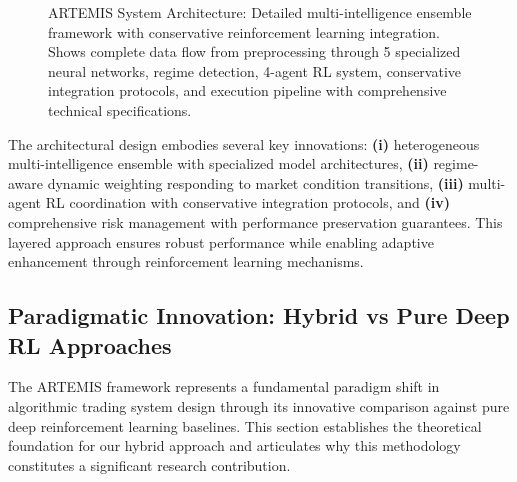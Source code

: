 \documentclass[10pt,twocolumn]{article}
\begin{document}
\begin{figure*}[t]
\caption{ARTEMIS System Architecture: Detailed multi-intelligence ensemble framework with conservative reinforcement learning integration. Shows complete data flow from preprocessing through 5 specialized neural networks, regime detection, 4-agent RL system, conservative integration protocols, and execution pipeline with comprehensive technical specifications.}
\label{fig:artemis_architecture}
\end{figure*}

The architectural design embodies several key innovations: \textbf{(i)} heterogeneous multi-intelligence ensemble with specialized model architectures, \textbf{(ii)} regime-aware dynamic weighting responding to market condition transitions, \textbf{(iii)} multi-agent RL coordination with conservative integration protocols, and \textbf{(iv)} comprehensive risk management with performance preservation guarantees. This layered approach ensures robust performance while enabling adaptive enhancement through reinforcement learning mechanisms.

\subsection{Paradigmatic Innovation: Hybrid vs Pure Deep RL Approaches}

The ARTEMIS framework represents a fundamental paradigm shift in algorithmic trading system design through its innovative comparison against pure deep reinforcement learning baselines. This section establishes the theoretical foundation for our hybrid approach and articulates why this methodology constitutes a significant research contribution.
\end{document}
